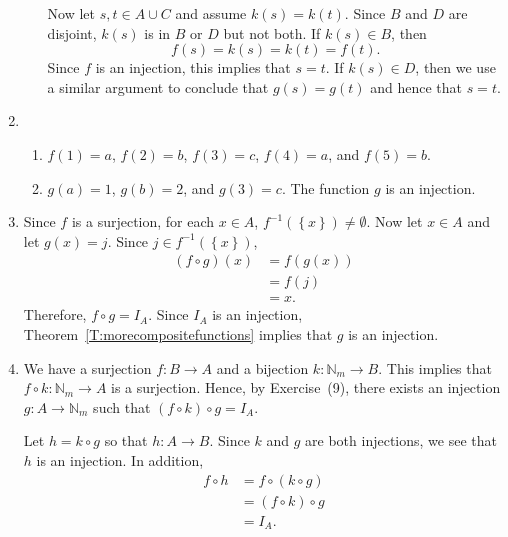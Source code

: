 \begin{enumerate}
\begin{enumerate}
Now let $s, t \in A \cup C$ and assume $k \left( s \right) = k \left( t \right)$.  Since $B$ and 
$D$ are disjoint, $k \left( s \right)$ is in $B$ or $D$ but not both.  If 
$k \left( s \right) \in B$, then
\[
f \left( s \right) = k \left( s \right) = k \left( t \right) = f \left( t \right).
\]
Since $f$ is an injection, this implies that $s = t$.  If $k \left( s \right) \in D$, then we use a similar argument to conclude that $g \left( s \right) = g \left( t \right)$ and hence that 
$s = t$.
\end{enumerate}

\item \begin{enumerate}
\item $f \left( 1 \right) = a$, $f \left( 2 \right) = b$, $f \left( 3 \right) = c$, 
$f \left( 4 \right) = a$, and $f \left( 5 \right) = b$.

\item $g \left( a \right) = 1$, $g \left( b \right) = 2$, and $g \left( 3 \right) = c$.  The function $g$ is an injection.
\end{enumerate}

\item Since $f$ is a surjection, for each $x \in A$, 
$f^{-1} \left( \left\{ x \right\} \right) \ne \emptyset$.  Now let $x \in A$ and let 
$g \left( x \right) = j$.  Since $j \in f^{-1} \left( \left\{ x \right\} \right)$,
\[
\begin{aligned}
\left( f \circ g \right) \left( x \right) &= f \left( g \left( x \right) \right) \\
                                          &= f \left( j \right) \\
                                          &= x.
\end{aligned}
\]
Therefore, $f \circ g = I_A$.  Since $I_A$ is an injection, Theorem~\ref{T:morecompositefunctions} implies that $g$ is an injection.

\item We have a surjection $f: B \to A$  and a bijection $k: \mathbb{N}_m \to B$.  This implies that $f \circ k: \mathbb{N}_m \to A$ is a surjection.  Hence, by Exercise~(9), there exists an injection $g: A \to \mathbb{N}_m$ such that $\left( f \circ k \right) \circ g = I_A$.

Let $h = k \circ g$ so that $h: A \to B$.  Since $k$ and $g$ are both injections, we see that $h$ is an injection.  In addition,
\[
\begin{aligned}
f \circ h &= f \circ \left( k \circ g \right) \\
          &= \left( f \circ k \right) \circ g \\
          &= I_A.
\end{aligned}
\]
\end{enumerate}



